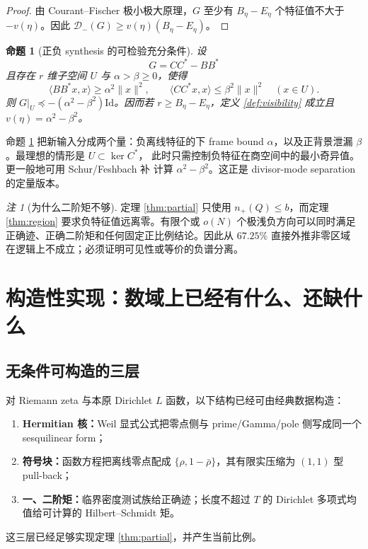 \documentclass[UTF8,11pt,a4paper]{ctexart}
\newtheorem{proposition}[theorem]{命题}
\theoremstyle{definition}
\theoremstyle{remark}
\newtheorem{remark}[theorem]{注}
\newcommand{\Id}{\mathrm{Id}}
\begin{document}
\begin{proof}
由 Courant--Fischer 极小极大原理，$G$ 至少有
$B_\eta-E_\eta$ 个特征值不大于 $-v(\eta)$。因此
$\mathcal{D}_-(G)\ge v(\eta)(B_\eta-E_\eta)$。
\end{proof}

\begin{proposition}[正负 synthesis 的可检验充分条件]\label{prop:synthesis}
设
\[
 G=CC^*-BB^*
\]
且存在 $r$ 维子空间 $U$ 与 $\alpha>\beta\ge0$，使得
\[
 \langle BB^*x,x\rangle\ge\alpha^2\|x\|^2,\qquad
 \langle CC^*x,x\rangle\le\beta^2\|x\|^2\quad(x\in U).
\]
则 $G|_U\preceq-(\alpha^2-\beta^2)\Id$。因而若
$r\ge B_\eta-E_\eta$，定义 \ref{def:visibility} 成立且
$v(\eta)=\alpha^2-\beta^2$。
\end{proposition}

命题 \ref{prop:synthesis} 把新输入分成两个量：负离线特征的下 frame bound
$\alpha$，以及正背景泄漏 $\beta$。最理想的情形是 $U\subset\ker C^*$，
此时只需控制负特征在商空间中的最小奇异值。更一般地可用 Schur/Feshbach 补
计算 $\alpha^2-\beta^2$。这正是 divisor-mode separation 的定量版本。

\begin{remark}[为什么二阶矩不够]
定理 \ref{thm:partial} 只使用 $n_+(Q)\le b$，而定理
\ref{thm:region} 要求负特征值远离零。有限个或 $o(N)$ 个极浅负方向可以同时满足
正确迹、正确二阶矩和任何固定正比例结论。因此从 $67.25\%$ 直接外推非零区域
在逻辑上不成立；必须证明可见性或等价的负谱分离。
\end{remark}

\section{构造性实现：数域上已经有什么、还缺什么}

\subsection{无条件可构造的三层}

对 Riemann zeta 与本原 Dirichlet $L$ 函数，以下结构已经可由经典数据构造：
\begin{enumerate}
\item \textbf{Hermitian 核：}Weil 显式公式把零点侧与
prime/Gamma/pole 侧写成同一个 sesquilinear form；
\item \textbf{符号块：}函数方程把离线零点配成
$\{\rho,1-\bar\rho\}$，其有限实压缩为 $(1,1)$ 型 pull-back；
\item \textbf{一、二阶矩：}临界密度测试族给正确迹；长度不超过 $T$ 的
Dirichlet 多项式均值给可计算的 Hilbert--Schmidt 矩。
\end{enumerate}
这三层已经足够实现定理 \ref{thm:partial}，并产生当前比例。
\end{document}
